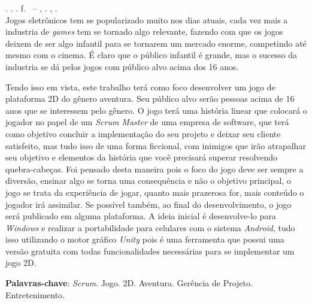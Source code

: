 
\begin{resumo}[RESUMO]
\begin{SingleSpacing}

\imprimirautorcitacao. \imprimirtitulo. \imprimirdata. \pageref {LastPage} f. \imprimirprojeto\ – \imprimirprograma, \imprimirinstituicao. \imprimirlocal, \imprimirdata.\\

Jogos eletrônicos tem se popularizado muito nos dias atuais, cada vez mais a industria de \textit{games} tem se tornado algo relevante, fazendo com que os jogos deixem de ser algo infantil para se tornarem um mercado enorme, competindo até mesmo com o cinema. É claro que o público infantil é grande, mas o sucesso da industria se dá pelos jogos com público alvo acima dos 16 anos.

Tendo isso em vista, este trabalho terá como foco desenvolver um jogo de plataforma 2D do gênero aventura. Seu público alvo serão pessoas acima de 16 anos que se interessem pelo gênero. O jogo terá uma história linear que colocará o jogador no papel de um \textit{Scrum Master} de uma empresa de software, que terá como objetivo concluir a implementação do seu projeto e deixar seu cliente satisfeito, mas tudo isso de uma forma ficcional, com inimigos que irão atrapalhar seu objetivo e elementos da história que você precisará superar resolvendo quebra-cabeças. Foi pensado desta maneira pois o foco do jogo deve ser sempre a diversão, ensinar algo se torna uma consequência e não o objetivo principal, o jogo se trata da experiência de jogar, quanto mais prazerosa for, mais conteúdo o jogador irá assimilar. Se possível também, ao final do desenvolvimento, o jogo será publicado em alguma plataforma. A ideia inicial é desenvolve-lo para \textit{Windows} e realizar a portabilidade para celulares com o sistema \textit{Android}, tudo isso utilizando o motor gráfico \textit{Unity} pois é uma ferramenta que possui uma versão gratuita com todas funcionalidades necessárias para se implementar um jogo 2D.


\textbf{Palavras-chave}: \textit{Scrum}. Jogo. 2D. Aventura. Gerência de Projeto. Entretenimento.

\end{SingleSpacing}
\end{resumo}

